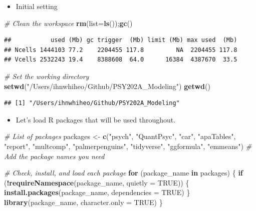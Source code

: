 \documentclass[
]{book}
\newenvironment{Shaded}{\begin{snugshade}}{\end{snugshade}}
\newcommand{\AttributeTok}[1]{\textcolor[rgb]{0.13,0.29,0.53}{#1}}
\newcommand{\CommentTok}[1]{\textcolor[rgb]{0.56,0.35,0.01}{\textit{#1}}}
\newcommand{\ConstantTok}[1]{\textcolor[rgb]{0.56,0.35,0.01}{#1}}
\newcommand{\ControlFlowTok}[1]{\textcolor[rgb]{0.13,0.29,0.53}{\textbf{#1}}}
\newcommand{\FunctionTok}[1]{\textcolor[rgb]{0.13,0.29,0.53}{\textbf{#1}}}
\newcommand{\NormalTok}[1]{#1}
\newcommand{\OtherTok}[1]{\textcolor[rgb]{0.56,0.35,0.01}{#1}}
\newcommand{\SpecialCharTok}[1]{\textcolor[rgb]{0.81,0.36,0.00}{\textbf{#1}}}
\newcommand{\StringTok}[1]{\textcolor[rgb]{0.31,0.60,0.02}{#1}}
\providecommand{\tightlist}{%
  \setlength{\itemsep}{0pt}\setlength{\parskip}{0pt}}
\begin{document}
\begin{itemize}
\tightlist
\item
  Initial setting
\end{itemize}

\begin{Shaded}
\begin{Highlighting}[]
\CommentTok{\# Clean the workspace}
\FunctionTok{rm}\NormalTok{(}\AttributeTok{list=}\FunctionTok{ls}\NormalTok{());}\FunctionTok{gc}\NormalTok{()}
\end{Highlighting}
\end{Shaded}

\begin{verbatim}
##           used (Mb) gc trigger  (Mb) limit (Mb) max used  (Mb)
## Ncells 1444103 77.2    2204455 117.8         NA  2204455 117.8
## Vcells 2532243 19.4    8388608  64.0      16384  4387670  33.5
\end{verbatim}

\begin{Shaded}
\begin{Highlighting}[]
\CommentTok{\# Set the working directory}
\FunctionTok{setwd}\NormalTok{(}\StringTok{"/Users/ihnwhiheo/Github/PSY202A\_Modeling"}\NormalTok{)}
\FunctionTok{getwd}\NormalTok{()}
\end{Highlighting}
\end{Shaded}

\begin{verbatim}
## [1] "/Users/ihnwhiheo/Github/PSY202A_Modeling"
\end{verbatim}

\begin{itemize}
\tightlist
\item
  Let's load R packages that will be used throughout.
\end{itemize}

\begin{Shaded}
\begin{Highlighting}[]
\CommentTok{\# List of packages}
\NormalTok{packages }\OtherTok{\textless{}{-}} \FunctionTok{c}\NormalTok{(}\StringTok{"psych"}\NormalTok{, }\StringTok{"QuantPsyc"}\NormalTok{, }\StringTok{"car"}\NormalTok{, }\StringTok{"apaTables"}\NormalTok{, }\StringTok{"report"}\NormalTok{, }\StringTok{"multcomp"}\NormalTok{,}
              \StringTok{"palmerpenguins"}\NormalTok{, }\StringTok{"tidyverse"}\NormalTok{, }\StringTok{"ggformula"}\NormalTok{, }\StringTok{"emmeans"}\NormalTok{) }\CommentTok{\# Add the package names you need}

\CommentTok{\# Check, install, and load each package}
\ControlFlowTok{for}\NormalTok{ (package\_name }\ControlFlowTok{in}\NormalTok{ packages) \{}
  \ControlFlowTok{if}\NormalTok{ (}\SpecialCharTok{!}\FunctionTok{requireNamespace}\NormalTok{(package\_name, }\AttributeTok{quietly =} \ConstantTok{TRUE}\NormalTok{)) \{}
    \FunctionTok{install.packages}\NormalTok{(package\_name, }\AttributeTok{dependencies =} \ConstantTok{TRUE}\NormalTok{)}
\NormalTok{  \}}
  \FunctionTok{library}\NormalTok{(package\_name, }\AttributeTok{character.only =} \ConstantTok{TRUE}\NormalTok{)}
\NormalTok{\}}
\end{Highlighting}
\end{Shaded}
\end{document}
